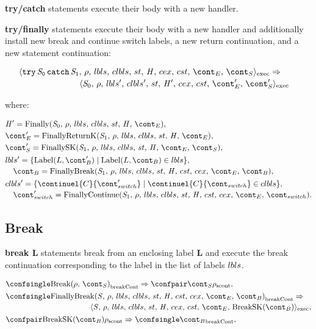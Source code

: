 \documentclass{article}
\newcommand{\cesktrans}[2]{\ensuremath{{#1} \Rightarrow {#2}}}
\newcommand{\cesktranssplit}[2]{\ensuremath{{#1} \Rightarrow\\ {#2}}}
\begin{document}
\textbf{try/catch} statements execute their body with a new handler.

\textbf{try/finally} statements execute their body with a new handler and additionally install new break and continue switch labels, a new return continuation, and a new statement continuation:

\begin{align*}
    &\begin{multlined}
        \cesktranssplit
            {\execconf{\TryFinally{\stmti{0}}{\stmti{1}}}{\env}{\lbls}{\clbls}{\handler}{\cex}{\cstrace}{\econt}{\scont}}%
            {\execconf{\stmti{0}}{\env}{\lbls'}{\clbls'}{\handler'}{\cex}{\cstrace}{\econt'}{\scont'}}
    \end{multlined}
\end{align*}

\noindent where:

\begin{align*}
&\handler' = \FinallyK{\stmti{0}},\\
&\econt' = \FinallyReturnK{\stmti{1}},\\
&\scont' = \FinallySK{\stmti{1}},\\
&\begin{multlined}
    \lbls' = \lbrace \mathrm{Label}(L, \bcont') \mid \mathrm{Label}(L, \bcont) \in \lbls\rbrace,\\
    \bcont = \FinallyBreak{\stmti{1}}{\bcont},
\end{multlined}\\
&\begin{multlined}
    \clbls' =  \lbrace \continuel{C}{\switchcont'} \mid  \continuel{C}{\switchcont} \in \clbls\rbrace,\\
    \switchcont' = \FinallyContinue{\stmti{1}}{\switchcont}.
\end{multlined}
\end{align*}


\subsection{Break}

\textbf{break L} statements break from an enclosing label \textbf{L} and execute the break continuation corresponding to the label in the list of labels $lbls$.

\begin{align*}
    &\cesktrans%
        {\breakconf{\Break{\env}{\scont}}}%
        {\scontconf{\scont}{\env}},\\
    &\begin{multlined}
        \cesktranssplit%
            {\breakconf{\FinallyBreak{\stmt}{\bcont}}}%
            {\execconf{\stmt}{\env}{\lbls}{\clbls}{\handler}{\cex}{\cstrace}{\econt}{\mathrm{BreakSK}(\bcont)}},
    \end{multlined}\\
    &\cesktrans%
        {\scontconf{\mathrm{BreakSK}(\bcont)}{\env}}%
        {\breakconf{\bcont}},
\end{align*}
\end{document}
